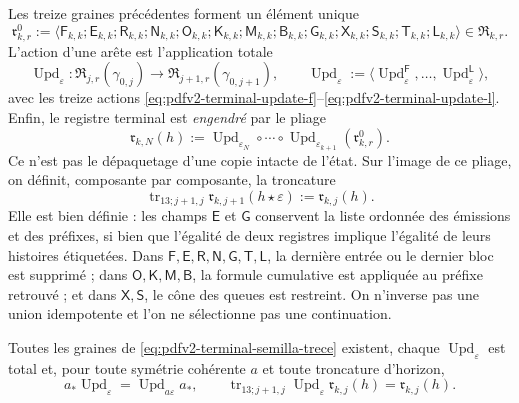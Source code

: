 Les treize graines précédentes forment un élément unique
\begin{equation}
\label{eq:pdfv2-terminal-semilla-trece}
 \mathfrak r^0_{k,r}:=
 \langle
 \mathsf F_{k,k};\mathsf E_{k,k};\mathsf R_{k,k};\mathsf N_{k,k};
 \mathsf O_{k,k};\mathsf K_{k,k};\mathsf M_{k,k};\mathsf B_{k,k};
 \mathsf G_{k,k};\mathsf X_{k,k};\mathsf S_{k,k};\mathsf T_{k,k};
 \mathsf L_{k,k}
 \rangle\in\mathfrak R_{k,r}.
\end{equation}
L'action d'une arête est l'application totale
\begin{equation}
\label{eq:pdfv2-terminal-actualizacion-unica}
 \operatorname{Upd}_\varepsilon:
 \mathfrak R_{j,r}(\gamma_{0,j})
 \longrightarrow\mathfrak R_{j+1,r}(\gamma_{0,j+1}),\qquad
 \operatorname{Upd}_\varepsilon:=
 \langle\operatorname{Upd}^{\mathsf F}_\varepsilon,\ldots,
 \operatorname{Upd}^{\mathsf L}_\varepsilon\rangle,
\end{equation}
avec les treize actions \eqref{eq:pdfv2-terminal-update-f}--\eqref{eq:pdfv2-terminal-update-l}. Enfin, le registre terminal est \emph{engendré} par le pliage
\begin{equation}
\label{eq:pdfv2-terminal-registro-trece}
 \boxed{
 \mathfrak r_{k,N}(h):=
 \operatorname{Upd}_{\varepsilon_N}\circ\cdots\circ
 \operatorname{Upd}_{\varepsilon_{k+1}}(\mathfrak r^0_{k,r}).}
\end{equation}
Ce n'est pas le dépaquetage d'une copie intacte de l'état. Sur l'image de ce pliage, on définit, composante par composante, la troncature
\begin{equation}
\label{eq:pdfv2-terminal-truncamiento-trece-def}
 \operatorname{tr}_{13;j+1,j}
 \mathfrak r_{k,j+1}(h\star\varepsilon)
 :=\mathfrak r_{k,j}(h).
\end{equation}
Elle est bien définie : les champs \(\mathsf E\) et \(\mathsf G\) conservent la liste ordonnée des émissions et des préfixes, si bien que l'égalité de deux registres implique l'égalité de leurs histoires étiquetées. Dans \(\mathsf F,\mathsf E,\mathsf R,\mathsf N,\mathsf G,\mathsf T,\mathsf L\), la dernière entrée ou le dernier bloc est supprimé ; dans \(\mathsf O,\mathsf K,\mathsf M,
\mathsf B\), la formule cumulative est appliquée au préfixe retrouvé ; et dans \(\mathsf X,\mathsf S\), le cône des queues est restreint. On n'inverse pas une union idempotente et l'on ne sélectionne pas une continuation.

\begin{proposition}
\label{prop:pdfv2-terminal-trece-total-natural}
Toutes les graines de \eqref{eq:pdfv2-terminal-semilla-trece} existent, chaque \(\operatorname{Upd}_\varepsilon\) est total et, pour toute symétrie cohérente \(a\) et toute troncature d'horizon,
\begin{equation}
\label{eq:pdfv2-terminal-trece-naturalidad}
 a_*\operatorname{Upd}_\varepsilon
 =\operatorname{Upd}_{a\varepsilon}a_*,
 \qquad
 \operatorname{tr}_{13;j+1,j}
 \operatorname{Upd}_\varepsilon\mathfrak r_{k,j}(h)
 =\mathfrak r_{k,j}(h).
\end{equation}
\end{proposition}


